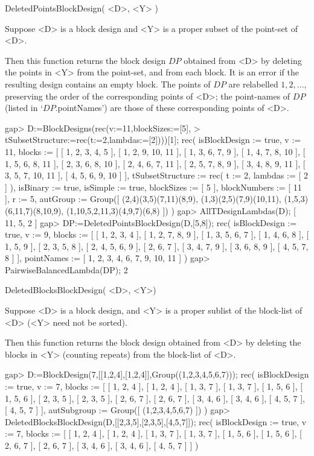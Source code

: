 \>DeletedPointsBlockDesign( <D>, <Y> )

Suppose <D> is a block design and <Y> is a proper subset of the point-set
of <D>.

Then this function returns the block design $DP$ obtained from <D> by
deleting the points in <Y> from the point-set, and from each block.
It is an error if the resulting design contains an empty block.
The points of $DP$ are relabelled $1,2,...$, preserving the order of
the corresponding points of <D>; the point-names of $DP$ (listed in
`$DP$.pointNames') are those of these corresponding points of <D>.


\beginexample
gap> D:=BlockDesigns(rec(v:=11,blockSizes:=[5],
>       tSubsetStructure:=rec(t:=2,lambdas:=[2])))[1];
rec( isBlockDesign := true, v := 11, 
  blocks := [ [ 1, 2, 3, 4, 5 ], [ 1, 2, 9, 10, 11 ], [ 1, 3, 6, 7, 9 ], 
      [ 1, 4, 7, 8, 10 ], [ 1, 5, 6, 8, 11 ], [ 2, 3, 6, 8, 10 ], 
      [ 2, 4, 6, 7, 11 ], [ 2, 5, 7, 8, 9 ], [ 3, 4, 8, 9, 11 ], 
      [ 3, 5, 7, 10, 11 ], [ 4, 5, 6, 9, 10 ] ], 
  tSubsetStructure := rec( t := 2, lambdas := [ 2 ] ), isBinary := true, 
  isSimple := true, blockSizes := [ 5 ], blockNumbers := [ 11 ], r := 5, 
  autGroup := Group([ (2,4)(3,5)(7,11)(8,9), (1,3)(2,5)(7,9)(10,11), 
      (1,5,3)(6,11,7)(8,10,9), (1,10,5,2,11,3)(4,9,7)(6,8) ]) )
gap> AllTDesignLambdas(D);      
[ 11, 5, 2 ]
gap> DP:=DeletedPointsBlockDesign(D,[5,8]);
rec( isBlockDesign := true, v := 9, 
  blocks := [ [ 1, 2, 3, 4 ], [ 1, 2, 7, 8, 9 ], [ 1, 3, 5, 6, 7 ], 
      [ 1, 4, 6, 8 ], [ 1, 5, 9 ], [ 2, 3, 5, 8 ], [ 2, 4, 5, 6, 9 ], 
      [ 2, 6, 7 ], [ 3, 4, 7, 9 ], [ 3, 6, 8, 9 ], [ 4, 5, 7, 8 ] ], 
  pointNames := [ 1, 2, 3, 4, 6, 7, 9, 10, 11 ] )
gap> PairwiseBalancedLambda(DP);
2
\endexample



\>DeletedBlocksBlockDesign( <D>, <Y>)

Suppose <D> is a block design, and <Y> is a proper sublist of the 
block-list of <D> (<Y> need not be sorted).
 
Then this function returns the block design obtained from <D> by deleting
the blocks in <Y> (counting repeats) from the block-list of <D>.

\beginexample
gap> D:=BlockDesign(7,[[1,2,4],[1,2,4]],Group((1,2,3,4,5,6,7)));
rec( isBlockDesign := true, v := 7, 
  blocks := [ [ 1, 2, 4 ], [ 1, 2, 4 ], [ 1, 3, 7 ], [ 1, 3, 7 ], 
      [ 1, 5, 6 ], [ 1, 5, 6 ], [ 2, 3, 5 ], [ 2, 3, 5 ], [ 2, 6, 7 ], 
      [ 2, 6, 7 ], [ 3, 4, 6 ], [ 3, 4, 6 ], [ 4, 5, 7 ], [ 4, 5, 7 ] ], 
  autSubgroup := Group([ (1,2,3,4,5,6,7) ]) )
gap> DeletedBlocksBlockDesign(D,[[2,3,5],[2,3,5],[4,5,7]]);
rec( isBlockDesign := true, v := 7, 
  blocks := [ [ 1, 2, 4 ], [ 1, 2, 4 ], [ 1, 3, 7 ], [ 1, 3, 7 ], 
      [ 1, 5, 6 ], [ 1, 5, 6 ], [ 2, 6, 7 ], [ 2, 6, 7 ], [ 3, 4, 6 ], 
      [ 3, 4, 6 ], [ 4, 5, 7 ] ] )
\endexample



